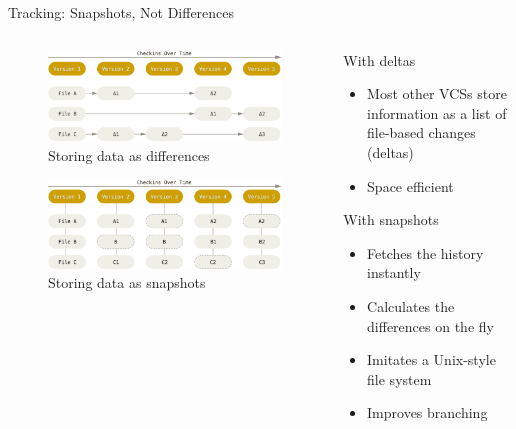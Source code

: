\begin{frame}[fragile]{Tracking: Snapshots, Not Differences}
  \begin{columns}
    \begin{column}{0.6\textwidth}
      \begin{figure}
        \includegraphics[width=\textwidth]{tracking/deltas}
        \caption{Storing data as differences}
      \end{figure}
      \begin{figure}
        \includegraphics[width=\textwidth]{tracking/snapshots}
        \caption{Storing data as snapshots}
      \end{figure}
    \end{column}
    \begin{column}{0.4\textwidth}
      With deltas
      \begin{itemize}
          \footnotesize
          \item Most other VCSs store information as a list of file-based changes (deltas)
          \item Space efficient
      \end{itemize}
      With snapshots
      \begin{itemize}
          \footnotesize
          \item Fetches the history instantly
          \item Calculates the differences on the fly
          \item Imitates a Unix-style file system
          \item Improves branching
      \end{itemize}
    \end{column}
  \end{columns}
\end{frame}
